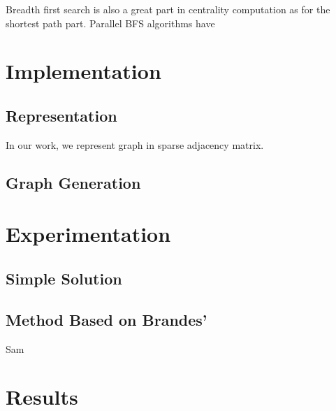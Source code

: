 \documentclass[11pt,a4paper,twocolumn,titlepage]{article}
\begin{document}
Breadth first search is also a great part in centrality computation as for the
shortest path part. Parallel BFS algorithms have 


\section{Implementation} %
\label{sec:data}

\subsection{Representation}
In our work, we represent graph in sparse adjacency matrix. 


\subsection{Graph Generation}


\section{Experimentation} %
\label{sec:methods}

\subsection{Simple Solution}

\subsection{Method Based on Brandes'}
Sam


\section{Results} %
\label{sec:results}
\end{document}

